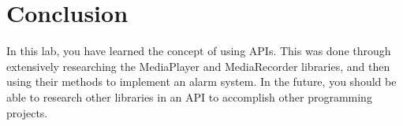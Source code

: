 \section{Conclusion}

In this lab, you have learned the concept of using APIs. This was done through extensively researching the MediaPlayer and MediaRecorder libraries, and then using their methods to implement an alarm system. In the future, you should be able to research other libraries in an API to accomplish other programming projects.